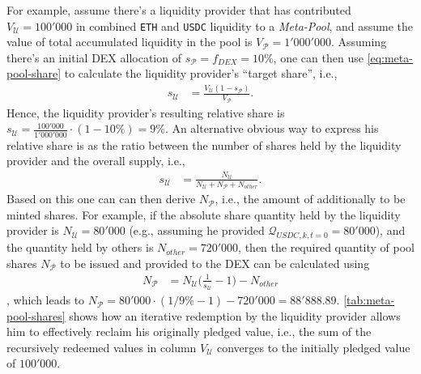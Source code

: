 \documentclass[a4paper]{article}
\begin{document}
For example, assume there's a liquidity provider that has contributed $V_{\mathcal{U}}=100'000$ in combined \verb|ETH| and \verb|USDC| liquidity to a \emph{Meta-Pool}, and assume the value of total accumulated liquidity in the pool is $V_{\mathcal{P}}=1'000'000$. Assuming there's an initial DEX allocation of $s_{\mathcal{P}}=f_{DEX}=10\%$, one can then use \cref{eq:meta-pool-share} to calculate the liquidity provider's ``target share'', i.e.,
\begin{equation}
\begin{split}
s_{\mathcal{U}} &= \frac{V_{\mathcal{U}}(1-s_{\mathcal{P}})}{V_{\mathcal{P}}}.
\end{split}
\end{equation}
Hence, the liquidity provider's resulting relative share is $s_{\mathcal{U}} = \frac{100'000}{1'000'000} \cdot (1-10\%)=9\%$. An alternative obvious way to express his relative share is as the ratio between the number of shares held by the liquidity provider and the overall supply, i.e.,
\begin{equation}
\begin{split}
s_{\mathcal{U}} &= \frac{N_{\mathcal{U}}}{N_{\mathcal{U}} + N_{\mathcal{P}} + N_{other}}.
\end{split}
\end{equation}
Based on this one can can then derive $N_\mathcal{P}$, i.e., the amount of additionally to be minted shares. For example, if the absolute share quantity held by the liquidity provider is $N_{\mathcal{U}}=80'000$ (e.g., assuming he provided $\mathcal{Q}_{USDC, k, t=0}=80'000$), and the quantity held by others is $N_{other}=720'000$, then the required quantity of pool shares $N_{\mathcal{P}}$ to be issued and provided to the DEX can be calculated using
\begin{equation}
\begin{split}
N_{\mathcal{P}} &= N_{\mathcal{U}} \Bigg( \frac{1}{s_{\mathcal{U}}} - 1 \Bigg) - N_{other}
\end{split}
\end{equation}
, which leads to $N_{\mathcal{P}}=80'000\cdot (1/9\% - 1) - 720'000=88'888.89$. \cref{tab:meta-pool-shares} shows how an iterative redemption by the liquidity provider allows him to effectively reclaim his originally pledged value, i.e., the sum of the recursively redeemed values in column $V_{\mathcal{U}}$ converges to the initially pledged value of $100'000$.
\end{document}
